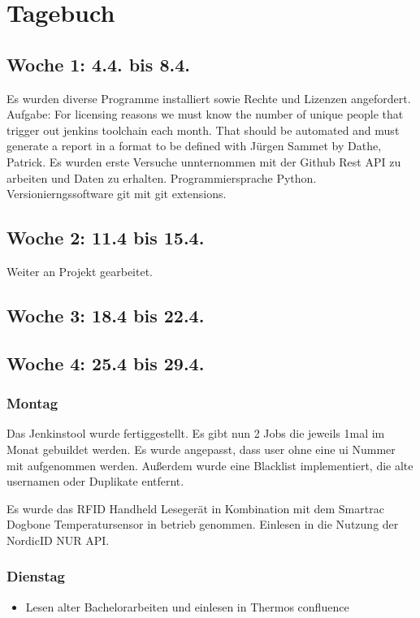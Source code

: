 \chapter{Tagebuch}

\section{Woche 1: 4.4. bis 8.4.}
Es wurden diverse Programme installiert sowie Rechte und Lizenzen angefordert. Aufgabe: For licensing reasons we must know the number of unique people that trigger out jenkins toolchain each month. That should be automated and must generate a report in a format to be defined with Jürgen Sammet by Dathe, Patrick. Es wurden erste Versuche unnternommen mit der Github Rest API zu arbeiten und Daten zu erhalten. Programmiersprache Python. Versionierngssoftware git mit git extensions.

\section{Woche 2: 11.4 bis 15.4.}
Weiter an Projekt gearbeitet. 
\section{Woche 3: 18.4 bis 22.4.}

\section{Woche 4: 25.4 bis 29.4.}
\subsection{Montag}
Das Jenkinstool wurde fertiggestellt. Es gibt nun 2 Jobs die jeweils 1mal im Monat gebuildet werden. Es wurde angepasst, dass user ohne eine ui Nummer mit aufgenommen werden. Außerdem wurde eine Blacklist implementiert, die alte usernamen oder Duplikate entfernt. 

Es wurde das RFID Handheld Lesegerät in Kombination mit dem Smartrac Dogbone Temperatursensor in betrieb genommen. Einlesen in die Nutzung der NordicID NUR API.

\subsection{Dienstag}
\begin{itemize}
	\item Lesen alter Bachelorarbeiten und einlesen in Thermos confluence
\end{itemize}